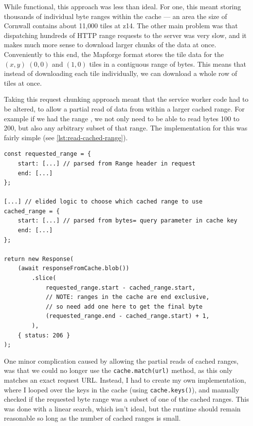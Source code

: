 \documentclass[hyphens]{final_report}
\begin{document}
While functional, this approach was less than ideal. For one, this meant storing thousands of individual byte ranges within the cache --- an area the size of Cornwall contains about 11,000 tiles at z14. The other main problem was that dispatching hundreds of HTTP range requests to the server was very slow, and it makes much more sense to download larger chunks of the data at once. Conveniently to this end, the Mapforge format stores the tile data for the \((x,y)\; (0,0)\) and \((1,0)\) tiles in a contiguous range of bytes. This means that instead of downloading each tile individually, we can download a whole row of tiles at once.

Taking this request chunking approach meant that the service worker code had to be altered, to allow a partial read of data from within a larger cached range. For example if we had the range , we not only need to be able to read bytes 100 to 200, but also any arbitrary subset of that range. The implementation for this was fairly simple (see \autoref{lst:read-cached-range}).

\begin{lstlisting}[caption=Reading a range from a cached response, label=lst:read-cached-range]
const requested_range = {
    start: [...] // parsed from Range header in request
    end: [...]
};

[...] // elided logic to choose which cached range to use 
cached_range = {
    start: [...] // parsed from bytes= query parameter in cache key
    end: [...]
};

return new Response(
    (await responseFromCache.blob())
        .slice(
            requested_range.start - cached_range.start,
            // NOTE: ranges in the cache are end exclusive,
            // so need add one here to get the final byte
            (requested_range.end - cached_range.start) + 1,
        ),
    { status: 206 }
);
\end{lstlisting}

One minor complication caused by allowing the partial reads of cached ranges, was that we could no longer use the \texttt{cache.match(url)} method, as this only matches an exact request URL\@. Instead, I had to create my own implementation, where I looped over the keys in the cache (using \texttt{cache.keys()}), and manually checked if the requested byte range was a subset of one of the cached ranges. This was done with a linear search, which isn't ideal, but the runtime should remain reasonable so long as the number of cached ranges is small.
\end{document}

